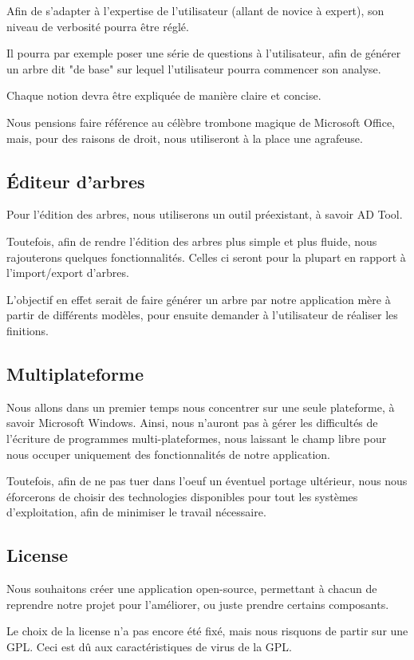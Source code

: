        Afin de s'adapter à l'expertise de l'utilisateur (allant de novice à expert), son niveau de verbosité pourra être réglé.
        
        Il pourra par exemple poser une série de questions à l'utilisateur, afin de générer un arbre dit "de base" sur lequel l'utilisateur pourra commencer son analyse.
        
        Chaque notion devra être expliquée de manière claire et concise.

        Nous pensions faire référence au célèbre trombone magique de Microsoft Office, mais, pour des raisons de droit, nous utiliseront à la place une agrafeuse.
        
    \subsection{\'Editeur d'arbres}
        \label{subsec:edit_arbre}
        Pour l'édition des arbres, nous utiliserons un outil préexistant, à savoir AD Tool\cite{adtool_paper}.
        
        Toutefois, afin de rendre l'édition des arbres plus simple et plus fluide, nous rajouterons quelques fonctionnalités. Celles ci seront pour la plupart en rapport à l'import/export d'arbres.

        L'objectif en effet serait de faire générer un arbre par notre application mère à partir de différents modèles, pour ensuite demander à l'utilisateur de réaliser les finitions.
    
    \subsection{Multiplateforme}
        Nous allons dans un premier temps nous concentrer sur une seule plateforme, à savoir Microsoft Windows. Ainsi, nous n'auront pas à gérer les difficultés de l'écriture de programmes multi-plateformes, nous laissant le champ libre pour nous occuper uniquement des fonctionnalités de notre application.

        Toutefois, afin de ne pas tuer dans l'oeuf un éventuel portage ultérieur, nous nous éforcerons de choisir des technologies disponibles pour tout les systèmes d'exploitation, afin de minimiser le travail nécessaire.

    \subsection{License}
        Nous souhaitons créer une application open-source, permettant à chacun de reprendre notre projet pour l'améliorer, ou juste prendre certains composants.

        Le choix de la license n'a pas encore été fixé, mais nous risquons de partir sur une GPL. Ceci est dû aux caractéristiques de virus de la GPL.